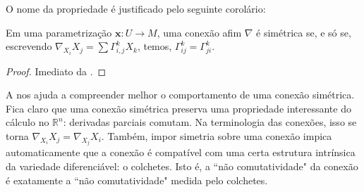 O nome da propriedade é justificado pelo seguinte corolário:
\begin{corollary}
    \label{loc:3.4_:_def_5_:_conexão_simétrica..corolário_1}
    Em uma parametrização $\mathbf{x}:U\to M$, uma conexão afim $\nabla$ é simétrica se, e só se, escrevendo $\nabla_{X_{i}}X_{j}=\sum \Gamma_{i,j}^{k}X_{k}$, temos, $\Gamma_{ij}^{k}=\Gamma_{ji}^{k}$.
    \begin{proof}

        Imediato da .
    \end{proof}
\end{corollary}
A  nos ajuda a compreender melhor o comportamento de uma conexão simétrica. Fica claro que uma conexão simétrica preserva uma propriedade interessante do cálculo no $\mathbb{R}^{n}$: derivadas parciais comutam. Na terminologia das conexões, isso se torna $\nabla_{X_{i}}X_{j}=\nabla_{X_{j}}X_{i}$. Também, impor simetria sobre uma conexão impica automaticamente que a conexão é compatível com uma certa estrutura intrínsica da variedade diferenciável: o colchetes. Isto é, a ``não comutatividade" da conexão é exatamente a ``não comutatividade" medida pelo colchetes.

